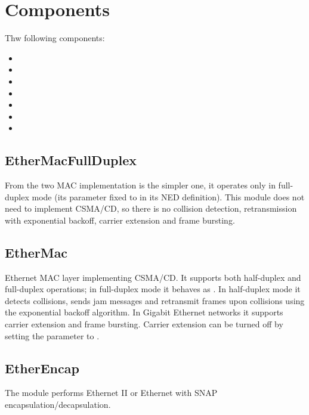 \section{Components}

Thw following components:

\begin{itemize}
  \item {}
  \item {}
  \item {}
  \item {}
  \item {}
  \item {}
  \item {}
\end{itemize}


\subsection{EtherMacFullDuplex}

From the two MAC implementation  is the simpler one,
it operates only in full-duplex mode (its  parameter fixed to
 in its NED definition). This module does not need to implement
CSMA/CD, so there is no collision detection, retransmission with exponential backoff,
carrier extension and frame bursting.

\subsection{EtherMac}

Ethernet MAC layer implementing CSMA/CD. It supports both half-duplex and full-duplex operations;
in full-duplex mode it behaves as . In half-duplex mode
it detects collisions, sends jam messages and retransmit frames upon collisions using
the exponential backoff algorithm. In Gigabit Ethernet networks it supports carrier
extension and frame bursting. Carrier extension can be turned off by setting the
 parameter to .

\subsection{EtherEncap}

The  module performs Ethernet II or Ethernet with SNAP
encapsulation/decapsulation.

